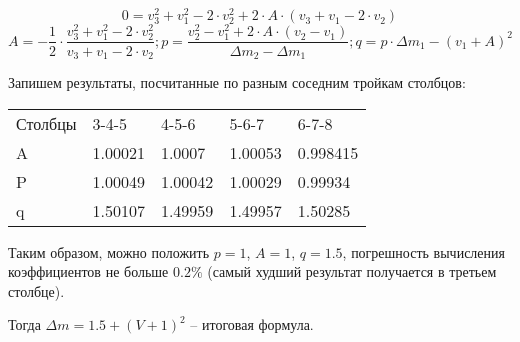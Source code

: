 $$0=v_3^2+v_1^2-2 \cdot v_2^2+2 \cdot A \cdot (v_3+v_1-2 \cdot v_2 )  $$
$$A=-\frac{1}{2} \cdot \frac{v_3^2+v_1^2-2 \cdot v_2^2}{v_3+v_1-2 \cdot v_2}; 
p=\frac{v_2^2-v_1^2+2 \cdot A \cdot (v_2-v_1 )}{\Delta m_2-\Delta m_1}; q=p \cdot \Delta m_1-(v_1+A)^2 $$

Запишем результаты, посчитанные по разным соседним тройкам столбцов:

\begin{tabular}{l l l l l}
    Столбцы & 3-4-5 & 4-5-6	& 5-6-7	& 6-7-8 \\
    A &	1.00021 & 1.0007 &	1.00053 &	0.998415 \\
    P &	1.00049 &	1.00042 &	1.00029 &	0.99934 \\
    q & 	1.50107 &	1.49959 &	1.49957 &	1.50285
\end{tabular}

Таким образом, можно положить $p = 1$, $A = 1$, $q = 1.5$, погрешность вычисления коэффициентов не 
больше $0.2 \%$ (самый худший результат получается в третьем столбце). 

Тогда $\Delta m=1.5+(V+1)^2$ – итоговая формула. 


